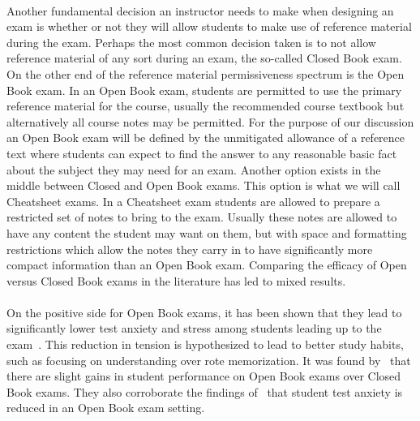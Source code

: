 \documentclass[12pt]{article}
\begin{document}
\paragraph{}
Another fundamental decision an instructor needs to make when designing an exam is whether or not they will allow students to make use of reference material during the exam. Perhaps the most common decision taken is to not allow reference material of any sort during an exam, the so-called Closed Book exam. On the other end of the reference material permissiveness spectrum is the Open Book exam. In an Open Book exam, students are permitted to use the primary reference material for the course, usually the recommended course textbook but alternatively all course notes may be permitted. For the purpose of our discussion an Open Book exam will be defined by the unmitigated allowance of a reference text where students can expect to find the answer to any reasonable basic fact about the subject they may need for an exam. Another option exists in the middle between Closed and Open Book exams. This option is what we will call Cheatsheet exams. In a Cheatsheet exam students are allowed to prepare a restricted set of notes to bring to the exam. Usually these notes are allowed to have any content the student may want on them, but with space and formatting restrictions which allow the notes they carry in to have significantly more compact information than an Open Book exam. Comparing the efficacy of Open versus Closed Book exams in the literature has led to mixed results.
\paragraph{}
On the positive side for Open Book exams, it has been shown that they lead to significantly lower test anxiety and stress among students leading up to the exam~\cite{broyles2005open}. This reduction in tension is hypothesized to lead to better study habits, such as focusing on understanding over rote memorization. It was found by~\cite{broyles2005open} that there are slight gains in student performance on Open Book exams over Closed Book exams. They also corroborate the findings of~\cite{broyles2005open} that student test anxiety is reduced in an Open Book exam setting. 
\end{document}
